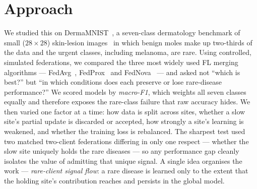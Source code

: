 \documentclass[10pt,a4paper,twocolumn]{article}
\begin{document}
\section*{Approach}
We studied this on DermaMNIST~\cite{yang2023medmnistv2}, a seven-class dermatology
benchmark of small ($28\times28$) skin-lesion images~\cite{tschandl2018ham10000} in
which benign moles make up two-thirds of the data and the urgent classes, including
melanoma, are rare. Using controlled, simulated federations, we compared the three
most widely used FL merging algorithms --- FedAvg~\cite{mcmahan2017fedavg},
FedProx~\cite{li2020fedprox} and FedNova~\cite{wang2020fednova} --- and asked not
``which is best?'' but ``in which conditions does each preserve or lose rare-disease
performance?'' We scored models by \emph{macro-F1}, which weights all seven classes
equally and therefore exposes the rare-class failure that raw accuracy hides. We then
varied one factor at a time: how data is split across sites, whether a slow site's
partial update is discarded or accepted, how strongly a site's learning is weakened,
and whether the training loss is rebalanced. The sharpest test used two matched
two-client federations differing in only one respect --- whether the slow site
uniquely holds the rare diseases --- so any performance gap cleanly isolates the value
of admitting that unique signal. A single idea organises the work ---
\emph{rare-client signal flow}: a rare disease is learned only to the extent that the
holding site's contribution reaches and persists in the global model.
\end{document}
